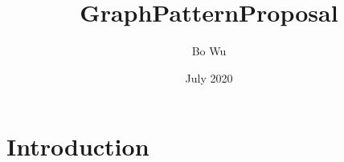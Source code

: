 \documentclass{article}
\title{GraphPatternProposal}
\author{Bo Wu}
\date{July 2020}
\begin{document}
\maketitle

\section{Introduction}
\end{document}
